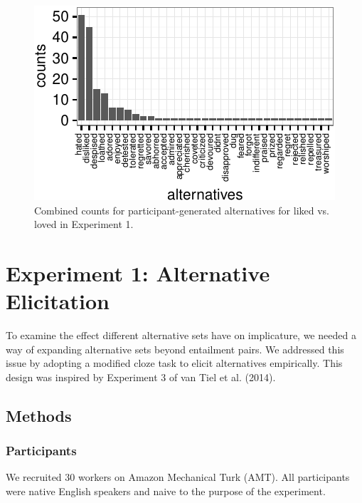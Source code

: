 \documentclass[10pt, letterpaper]{article}
\newenvironment{CodeChunk}{}{}
\begin{document}
\begin{CodeChunk}
\begin{figure}[t]

{\centering \includegraphics{figs/exp2_altsPlot_likedLoved-1} 

}

\caption[Combined counts for participant-generated alternatives for liked vs]{Combined counts for participant-generated alternatives for liked vs. loved in Experiment 1.}\label{fig:exp2_altsPlot_likedLoved}
\end{figure}
\end{CodeChunk}

\section{Experiment 1: Alternative
Elicitation}\label{experiment-1-alternative-elicitation}

To examine the effect different alternative sets have on implicature, we
needed a way of expanding alternative sets beyond entailment pairs. We
addressed this issue by adopting a modified cloze task to elicit
alternatives empirically. This design was inspired by Experiment 3 of
{van Tiel} et al. (2014).

\subsection{Methods}\label{methods}

\subsubsection{Participants}\label{participants}

We recruited 30 workers on Amazon Mechanical Turk (AMT). All
participants were native English speakers and naive to the purpose of
the experiment.
\end{document}
